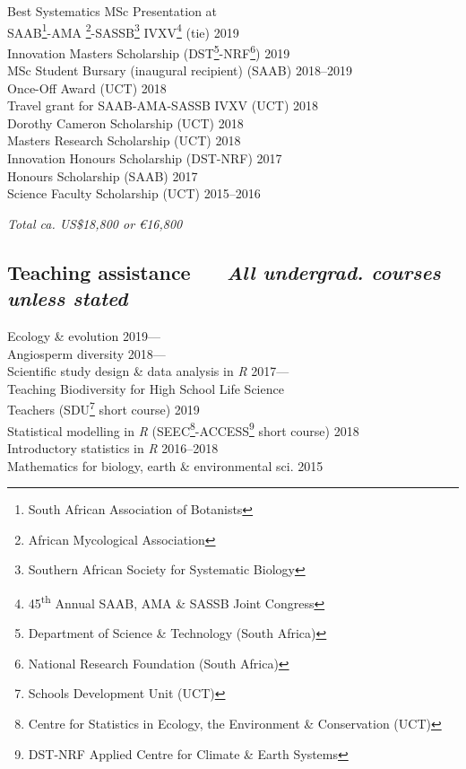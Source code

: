 \documentclass[10pt]{article}
\begin{document}
\begin{multicols}{2}
Best Systematics MSc Presentation at \\
\hspace{2em} SAAB\footnote{South African Association of Botanists}-AMA
  \footnote{African
  Mycological Association}-SASSB\footnote{Southern African Society for 
  Systematic Biology} IVXV\footnote{45\textsuperscript{th} Annual SAAB, AMA \& 
  SASSB Joint Congress} (tie)
  \hfill 2019 \\
Innovation Masters Scholarship {\footnotesize (DST\footnote{Department of 
  Science \& Technology (South Africa)}-NRF\footnote{National Research 
  Foundation (South Africa)})}
  \hfill 2019 \\
MSc Student Bursary (inaugural recipient) {\footnotesize (SAAB)}
  \hfill 2018--2019 \\
Once-Off Award {\footnotesize (UCT)}
  \hfill 2018 \\
Travel grant for SAAB-AMA-SASSB IVXV {\footnotesize (UCT)}
  \hfill 2018 \\
Dorothy Cameron Scholarship {\footnotesize (UCT)}
  \hfill 2018 \\
Masters Research Scholarship {\footnotesize (UCT)}
  \hfill 2018 \\
Innovation Honours Scholarship {\footnotesize (DST-NRF)}
  \hfill 2017 \\
Honours Scholarship {\footnotesize (SAAB)}
  \hfill 2017 \\
Science Faculty Scholarship {\footnotesize (UCT)}
  \hfill 2015--2016

\begin{center}
\textit{Total ca. US\$18,800 or €16,800}
\end{center}


\columnbreak

\subsection*{%
  Teaching assistance
  ~~{\footnotesize \textmd{\textit{
    All undergrad. courses unless stated
  }}}
}

Ecology \& evolution
  \hfill 2019--- \\
Angiosperm diversity
  \hfill 2018--- \\
Scientific study design \& data analysis in \textit{R}
  \hfill 2017--- \\
Teaching Biodiversity for High School Life Science \\
  \hspace{2em} Teachers {\footnotesize
  (SDU\footnote{Schools Development Unit (UCT)} short course)}
  \hfill 2019 \\
Statistical modelling in \textit{R} {\footnotesize (SEEC\footnote{Centre for 
  Statistics in Ecology, the Environment \& Conservation (UCT)}-ACCESS\footnote{
  DST-NRF Applied Centre for Climate \& Earth Systems} short course)}
  \hfill 2018 \\
Introductory statistics in \textit{R}
  \hfill 2016--2018 \\
Mathematics for biology, earth \& environmental sci.
  \hfill 2015


\end{multicols}
\end{document}
